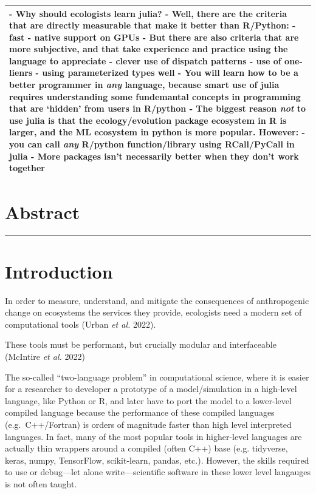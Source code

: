 \documentclass[10pt,oneside]{article}
\begin{document}
\begin{longtable}[]{@{}l@{}}
\toprule
\endhead
\begin{minipage}[t]{0.05\columnwidth}\raggedright
- Why should ecologists learn julia? - Well, there are the criteria that
are directly measurable that make it better than R/Python: - fast -
native support on GPUs - But there are also criteria that are more
subjective, and that take experience and practice using the language to
appreciate - clever use of dispatch patterns - use of one-lienrs - using
parameterized types well - You will learn how to be a better programmer
in \emph{any} language, because smart use of julia requires
understanding some fundemantal concepts in programming that are `hidden'
from users in R/python - The biggest reason \emph{not} to use julia is
that the ecology/evolution package ecosystem in R is larger, and the ML
ecosystem in python is more popular. However: - you can call \emph{any}
R/python function/library using RCall/PyCall in julia - More packages
isn't necessarily better when they don't work together\strut
\end{minipage}\tabularnewline
\bottomrule
\end{longtable}

\hypertarget{abstract}{%
\section{Abstract}\label{abstract}}

\begin{center}\rule{0.5\linewidth}{0.5pt}\end{center}

\hypertarget{introduction}{%
\section{Introduction}\label{introduction}}

In order to measure, understand, and mitigate the consequences of
anthropogenic change on ecosystems the services they provide, ecologists
need a modern set of computational tools (Urban \emph{et al.} 2022).

These tools must be performant, but crucially modular and interfaceable
(McIntire \emph{et al.} 2022)

The so-called ``two-language problem'' in computational science, where
it is easier for a researcher to developer a prototype of a
model/simulation in a high-level language, like Python or R, and later
have to port the model to a lower-level compiled language because the
performance of these compiled languages (e.g.~C++/Fortran) is orders of
magnitude faster than high level interpreted languages. In fact, many of
the most popular tools in higher-level languages are actually thin
wrappers around a compiled (often C++) base (e.g. tidyverse, keras,
numpy, TensorFlow, scikit-learn, pandas, etc.). However, the skills
required to use or debug---let alone write---scientific software in
these lower level langauges is not often taught.
\end{document}
